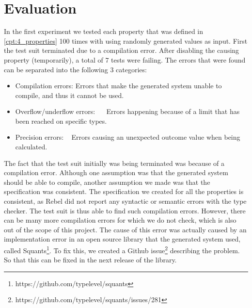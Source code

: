 \section{Evaluation}
In the first experiment we tested each property that was defined in \autoref{cpt:4_properties} 100 times with using randomly generated values as input. First the test suit terminated due to a compilation error. After disabling the causing property (temporarily), a total of 7 tests were failing. The errors that were found can be separated into the following 3 categories:
\begin{itemize}
\item Compilation errors: Errors that make the generated system unable to compile, and thus it cannot be used.
\item Overflow/underflow errors:~ ~ Errors happening because of a limit that has been reached on specific types.
\item Precision errors: ~ Errors causing an unexpected outcome value when being calculated.
\end{itemize}
The fact that the test suit initially was being terminated was because of a compilation error. Although one assumption was that the generated system should be able to compile, another assumption we made was that the specification was consistent. The specification we created for all the properties is consistent, as Rebel did not report any syntactic or semantic errors with the type checker. The test suit is thus able to find such compilation errors. However, there can be many more compilation errors for which we do not check, which is also out of the scope of this project. The cause of this error was actually caused by an implementation error in an open source library that the generated system used, called Squants\footnote{https://github.com/typelevel/squants}. To fix this, we created a Github issue\footnote{https://github.com/typelevel/squants/issues/281} describing the problem. So that this can be fixed in the next release of the library.\\

